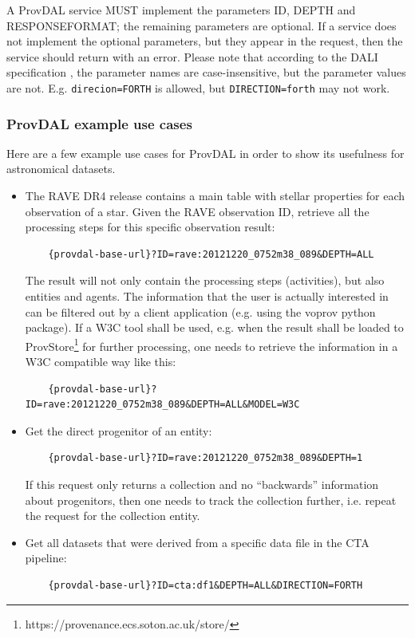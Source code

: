 A ProvDAL service MUST implement the parameters ID, DEPTH and RESPONSEFORMAT; the remaining parameters are optional.
If a service does not implement the optional parameters, but they appear in the request, then the service should return with an error.
Please note that according to the DALI specification \citep{std:DALI}, the parameter names are case-insensitive, but the parameter values are not. E.g. \texttt{direcion=FORTH} is allowed, but \texttt{DIRECTION=forth} may not work.




\subsubsection{ProvDAL example use cases}
Here are a few example use cases for ProvDAL in order to show its usefulness for astronomical datasets.

\begin{itemize}
\item The RAVE DR4 release contains a main table with stellar properties for each observation of a star. Given the RAVE observation ID, retrieve all the processing steps
for this specific observation result:

	\begin{verbatim}
	{provdal-base-url}?ID=rave:20121220_0752m38_089&DEPTH=ALL
	\end{verbatim}

The result will not only contain the processing steps (activities), but also entities and agents. The information that the user is actually interested in can be filtered out by a client application (e.g. using the  voprov python package). If a W3C tool shall be used, e.g. when the result shall be loaded to ProvStore\footnote{https://provenance.ecs.soton.ac.uk/store/} for further processing, one needs to retrieve the information in a W3C compatible way like this:

	\begin{verbatim}
	{provdal-base-url}?ID=rave:20121220_0752m38_089&DEPTH=ALL&MODEL=W3C
	\end{verbatim}

\item Get the direct progenitor of an entity:
	\begin{verbatim}
	{provdal-base-url}?ID=rave:20121220_0752m38_089&DEPTH=1
	\end{verbatim}
	If this request only returns a collection and no ``backwards'' information about progenitors, then one needs to track the collection further, i.e. repeat the request for the collection entity.

\item Get all datasets that were derived from a specific data file in the CTA pipeline:
	\begin{verbatim}
	{provdal-base-url}?ID=cta:df1&DEPTH=ALL&DIRECTION=FORTH
	\end{verbatim}

\end{itemize}

